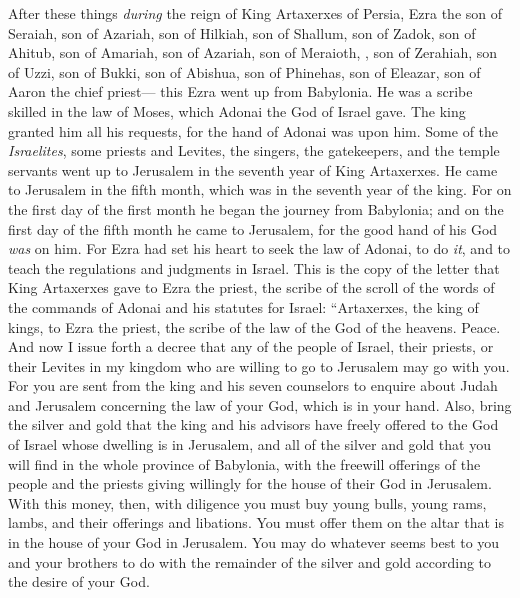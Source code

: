 \begin{biblechapter} %
 After these things \textit{during} the reign of King Artaxerxes of Persia, Ezra the son of Seraiah, son of Azariah, son of Hilkiah,
\verse son of Shallum, son of Zadok, son of Ahitub,
\verse son of Amariah, son of Azariah, son of Meraioth,
\verse , son of Zerahiah, son of Uzzi, son of Bukki,
\verse son of Abishua, son of Phinehas, son of Eleazar, son of Aaron the chief priest—
\verse this Ezra went up from Babylonia. He was a scribe skilled in the law of Moses, which Adonai the God of Israel gave. The king granted him all his requests, for the hand of Adonai was upon him.
\verse Some of the \textit{Israelites}, some priests and Levites, the singers, the gatekeepers, and the temple servants went up to Jerusalem in the seventh year of King Artaxerxes.
\verse He came to Jerusalem in the fifth month, which was in the seventh year of the king.
\verse For on the first day of the first month he began the journey from Babylonia; and on the first day of the fifth month he came to Jerusalem, for the good hand of his God \textit{was} on him.
\verse For Ezra had set his heart to seek the law of Adonai, to do \textit{it}, and to teach the regulations and judgments in Israel.
 This is the copy of the letter that King Artaxerxes gave to Ezra the priest, the scribe of the scroll of the words of the commands of Adonai and his statutes for Israel:
\verse “Artaxerxes, the king of kings, to Ezra the priest, the scribe of the law of the God of the heavens. Peace. And now
\verse I issue forth a decree that any of the people of Israel, their priests, or their Levites in my kingdom who are willing to go to Jerusalem may go with you.
\verse For you are sent from the king and his seven counselors to enquire about Judah and Jerusalem concerning the law of your God, which is in your hand.
\verse Also, bring the silver and gold that the king and his advisors have freely offered to the God of Israel whose dwelling is in Jerusalem,
\verse and all of the silver and gold that you will find in the whole province of Babylonia, with the freewill offerings of the people and the priests giving willingly for the house of their God in Jerusalem.
\verse With this money, then, with diligence you must buy young bulls, young rams, lambs, and their offerings and libations. You must offer them on the altar that is in the house of your God in Jerusalem.
\verse You may do whatever seems best to you and your brothers to do with the remainder of the silver and gold according to the desire of your God.

\end{biblechapter}
